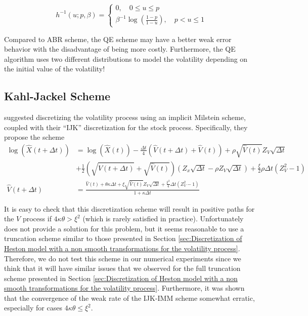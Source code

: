 \begin{enumerate}
\begin{enumerate}
 \[
    h^{-1}(u; p,\beta)=\left\{
                \begin{array}{ll}
                  0, \quad  0 \le u \le p\\
                   \beta^{-1} \log\left(\frac{1-p}{1-u}\right), \quad  p< u \le 1
                \end{array}
              \right.
  \]
\end{enumerate}
\end{enumerate}

Compared to ABR scheme, the QE scheme may have a better weak error behavior with the disadvantage of being more costly. Furthermore, the QE algorithm uses two different distributions to model the volatility depending on the initial value of the volatility!
\subsection{Kahl-Jackel Scheme}
\cite{kahl2006fast} suggested discretizing the volatility process using an implicit Milstein scheme, coupled with their “IJK” discretization for the stock process. Specifically, they propose the scheme
\begin{align}
\log(\hat{X}(t+\Delta t))&=\log(\hat{X}(t))-\frac{\Delta t}{4} \left(\hat{V}(t+\Delta t)+ \hat{V}(t) \right) +\rho \sqrt{\hat{V}(t)} Z_V \sqrt{\Delta t}  \nonumber\\
& +\frac{1}{2} \left(\sqrt{\hat{V}(t+\Delta t)}+ \sqrt{\hat{V}(t)} \right) \left(Z_x \sqrt{\Delta t}- \rho Z_V \sqrt{\Delta t}  \right) +\frac{\xi}{2} \rho  \Delta t (Z_V^2-1) \nonumber\\
 \hat{V}(t+\Delta t)&=\frac{\hat{V}(t)+\theta \kappa \Delta t+\xi \sqrt{\hat{V}(t)} Z_V \sqrt{\Delta t} +\frac{\xi^2}{4} \Delta t (Z_V^2-1) }{1+ \kappa \Delta t }
\end{align}

It is easy to check that this discretization scheme will result in positive paths for the $V$ process if $4 \kappa \theta >\xi^2$ (which is rarely satisfied in practice). Unfortunately \cite{kahl2006fast} does not provide a solution for this problem, but it seems reasonable to use a truncation scheme similar to those presented in Section \ref{sec:Discretization of Heston model with a non smooth transformations for the volatility process}.  Therefore, we do not test this scheme in our numerical experiments since we think that it will have similar issues that we observed for the full truncation scheme presented in Section \ref{sec:Discretization of Heston model with a non smooth transformations for the volatility process}. Furthermore, it was shown that the convergence of the weak rate of the IJK-IMM scheme  somewhat erratic, especially for cases  $4 \kappa \theta \le \xi^2$.

